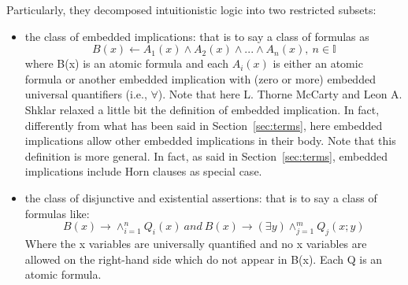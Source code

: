 Particularly, they decomposed intuitionistic logic into two restricted subsets:
\begin{itemize}
  \item the class of embedded implications: that is to say a class of formulas as
    \begin{equation}
      B(x) \leftarrow A_1(x) \wedge A_2(x) \wedge ... \wedge A_n(x),\ n \in \mathbb{I}
    \end{equation}
    where B(x) is an atomic formula and each $A_i(x)$ is either an atomic formula
    or another embedded implication with (zero or more) embedded universal quantifiers
    (i.e., $\forall$). Note that here L. Thorne McCarty and Leon A. Shklar relaxed
    a little bit the definition of embedded implication. In fact, differently from
    what has been said in Section~\ref{sec:terms}, here embedded implications allow
    other embedded implications in their body. Note that this definition is more 
    general. In fact, as said in Section~\ref{sec:terms}, embedded implications
    include Horn clauses as special case.

  \item the class of disjunctive and existential assertions: that is to say a class
    of formulas like:
    \begin{equation}
      B(x) \rightarrow \wedge^{n}_{i=1} Q_i(x)\ and\ B(x) \rightarrow (\exists y) \wedge^m_{j=1}Q_j(x;y)
    \end{equation}
    Where the x variables are universally quantified and no x variables are allowed
    on the right-hand side which do not appear in B(x). Each Q is an atomic formula.
\end{itemize}


